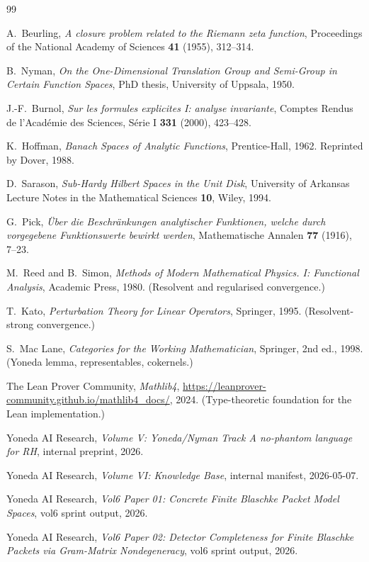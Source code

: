 \documentclass[12pt]{article}
\theoremstyle{definition}
\theoremstyle{remark}
\begin{document}
\begin{thebibliography}{99}

A.~Beurling, \textit{A closure problem related to the Riemann zeta function}, Proceedings of the National Academy of Sciences \textbf{41} (1955), 312--314.

B.~Nyman, \textit{On the One-Dimensional Translation Group and Semi-Group in Certain Function Spaces}, PhD thesis, University of Uppsala, 1950.

J.-F.~Burnol, \textit{Sur les formules explicites I: analyse invariante}, Comptes Rendus de l'Acad\'emie des Sciences, S\'erie I \textbf{331} (2000), 423--428.

K.~Hoffman, \textit{Banach Spaces of Analytic Functions}, Prentice-Hall, 1962. Reprinted by Dover, 1988.

D.~Sarason, \textit{Sub-Hardy Hilbert Spaces in the Unit Disk}, University of Arkansas Lecture Notes in the Mathematical Sciences \textbf{10}, Wiley, 1994.

G.~Pick, \textit{\"Uber die Beschr\"ankungen analytischer Funktionen, welche durch vorgegebene Funktionswerte bewirkt werden}, Mathematische Annalen \textbf{77} (1916), 7--23.

M.~Reed and B.~Simon, \textit{Methods of Modern Mathematical Physics. I: Functional Analysis}, Academic Press, 1980. (Resolvent and regularised convergence.)

T.~Kato, \textit{Perturbation Theory for Linear Operators}, Springer, 1995. (Resolvent-strong convergence.)

S.~Mac Lane, \textit{Categories for the Working Mathematician}, Springer, 2nd ed., 1998. (Yoneda lemma, representables, cokernels.)

The Lean Prover Community, \textit{Mathlib4}, \url{https://leanprover-community.github.io/mathlib4_docs/}, 2024. (Type-theoretic foundation for the Lean implementation.)

Yoneda AI Research, \textit{Volume V: Yoneda/Nyman Track A no-phantom language for RH}, internal preprint, 2026.

Yoneda AI Research, \textit{Volume VI: Knowledge Base}, internal manifest, 2026-05-07.

Yoneda AI Research, \textit{Vol6 Paper 01: Concrete Finite Blaschke Packet Model Spaces}, vol6 sprint output, 2026.

Yoneda AI Research, \textit{Vol6 Paper 02: Detector Completeness for Finite Blaschke Packets via Gram-Matrix Nondegeneracy}, vol6 sprint output, 2026.

\end{thebibliography}
\end{document}
